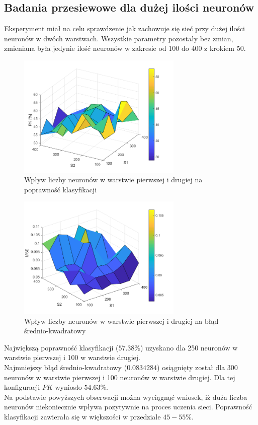 \subsection{Badania przesiewowe dla dużej ilości neuronów}
Eksperyment miał na celu sprawdzenie jak zachowuje się sieć przy dużej ilości neuronów w dwóch warstwach. Wszystkie parametry pozostały bez zmian, zmieniana była jedynie ilość neuronów w zakresie od 100 do 400 z krokiem 50.
\begin{figure}[!h]
\centering
\includegraphics[width = 0.7\textwidth]{Grafika/PK_duze.png}
\caption{Wpływ liczby neuronów w warstwie pierwszej i drugiej na poprawność klasyfikacji}
\label{fig:PKeksperyment2}
\end{figure}
\begin{figure}[!h]
\centering
\includegraphics[width = 0.7\textwidth]{Grafika/MSE_duze.png}
\caption{Wpływ liczby neuronów w warstwie pierwszej i drugiej na błąd średnio-kwadratowy}
\label{fig:MSEeksperyment2}
\end{figure}
\clearpage
Największą poprawność klasyfikacji ($57.38\%$) uzyskano dla 250 neuronów w warstwie pierwszej i 100 w warstwie drugiej.\\
Najmniejszy błąd średnio-kwadratowy ($0.0834284$) osiągnięty został dla 300 neuronów w warstwie pierwszej i 100 neuronów w warstwie drugiej. Dla tej konfiguracji $PK$ wyniosło $54.63\%$.\\
Na podstawie powyższych obserwacji można wyciągnąć wniosek, iż duża liczba neuronów niekoniecznie wpływa pozytywnie na proces uczenia sieci. Poprawność klasyfikacji zawierała się w większości w przedziale $45-55\%$.

